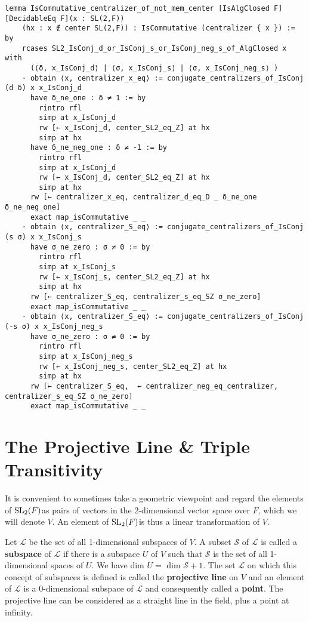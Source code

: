 \begin{footnotesize}
\begin{verbatim}
lemma IsCommutative_centralizer_of_not_mem_center [IsAlgClosed F] [DecidableEq F](x : SL(2,F))
    (hx : x ∉ center SL(2,F)) : IsCommutative (centralizer { x }) := by
    rcases SL2_IsConj_d_or_IsConj_s_or_IsConj_neg_s_of_AlgClosed x with
      (⟨δ, x_IsConj_d⟩ | ⟨σ, x_IsConj_s⟩ | ⟨σ, x_IsConj_neg_s⟩ )
    · obtain ⟨x, centralizer_x_eq⟩ := conjugate_centralizers_of_IsConj (d δ) x x_IsConj_d
      have δ_ne_one : δ ≠ 1 := by
        rintro rfl
        simp at x_IsConj_d
        rw [← x_IsConj_d, center_SL2_eq_Z] at hx
        simp at hx
      have δ_ne_neg_one : δ ≠ -1 := by
        rintro rfl
        simp at x_IsConj_d
        rw [← x_IsConj_d, center_SL2_eq_Z] at hx
        simp at hx
      rw [← centralizer_x_eq, centralizer_d_eq_D _ δ_ne_one δ_ne_neg_one]
      exact map_isCommutative _ _
    · obtain ⟨x, centralizer_S_eq⟩ := conjugate_centralizers_of_IsConj (s σ) x x_IsConj_s
      have σ_ne_zero : σ ≠ 0 := by
        rintro rfl
        simp at x_IsConj_s
        rw [← x_IsConj_s, center_SL2_eq_Z] at hx
        simp at hx
      rw [← centralizer_S_eq, centralizer_s_eq_SZ σ_ne_zero]
      exact map_isCommutative _ _
    · obtain ⟨x, centralizer_S_eq⟩ := conjugate_centralizers_of_IsConj (-s σ) x x_IsConj_neg_s
      have σ_ne_zero : σ ≠ 0 := by
        rintro rfl
        simp at x_IsConj_neg_s
        rw [← x_IsConj_neg_s, center_SL2_eq_Z] at hx
        simp at hx
      rw [← centralizer_S_eq,  ← centralizer_neg_eq_centralizer, centralizer_s_eq_SZ σ_ne_zero]
      exact map_isCommutative _ _
\end{verbatim}
\end{footnotesize}



\section{The Projective Line \& Triple Transitivity}

It is convenient to sometimes take a geometric viewpoint and regard the elements of $\operatorname{SL}_2(F)$as pairs of vectors in the 2-dimensional vector space over $F$, which we will denote $V$. An element of $\operatorname{SL}_2(F)$is thus a linear transformation of $V$. 

\begin{definition} 
    Let $\mathscr{L}$ be the set of all 1-dimensional subspaces of $V$. A subset $\mathscr{S}$ of $\mathscr{L}$ is called a \textbf{subspace} of $\mathscr{L}$ if there is a subspace $U$ of $V$ such that $\mathscr{S}$ is the set of all 1-dimensional spaces of $U$. We have dim $U =$ dim $\mathscr{S} + 1$. The set $\mathscr{L}$ on which this concept of subspaces is defined is called the \textbf{projective line} on $V$ and an element of $\mathscr{L}$ is a 0-dimensional subspace of $\mathscr{L}$ and consequently called a \textbf{point}. The projective line can be considered as a straight line in the field, plus a point at infinity.
\end{definition}

